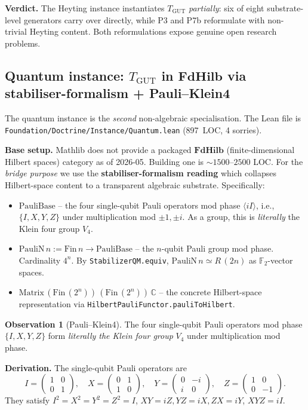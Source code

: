 \documentclass[11pt,a4paper]{article}
\theoremstyle{plain}
\theoremstyle{definition}
\newtheorem{observation}[theorem]{Observation}
\theoremstyle{remark}
\newcommand{\F}{\mathbb{F}}
\newcommand{\C}{\mathbb{C}}
\newcommand{\cat}[1]{\mathbf{#1}}
\newcommand{\FdHilb}{\cat{FdHilb}}
\newcommand{\TGUT}{T_{\mathrm{GUT}}}
\newcommand{\PauliBase}{\mathrm{PauliBase}}
\newcommand{\PauliN}{\mathrm{PauliN}}
\begin{document}
\textbf{Verdict.} The Heyting instance instantiates $\TGUT$ \emph{partially}: six of eight substrate-level generators carry over directly, while P3 and P7b reformulate with non-trivial Heyting content. Both reformulations expose genuine open research problems.

\subsection{Quantum instance: $\TGUT$ in $\FdHilb$ via stabiliser-formalism + Pauli--Klein4}\label{sec:inst:quantum}

The quantum instance is the \emph{second} non-algebraic specialisation. The Lean file is \texttt{Foundation/Doctrine/Instance/Quantum.lean} (897~LOC, 4 sorries).

\textbf{Base setup.} Mathlib does not provide a packaged $\FdHilb$ (finite-dimensional Hilbert spaces) category as of 2026-05. Building one is ${\sim}1500$--$2500$ LOC. For the \emph{bridge purpose} we use the \textbf{stabiliser-formalism reading} which collapses Hilbert-space content to a transparent algebraic substrate. Specifically:

\begin{itemize}[leftmargin=*]
\item $\PauliBase$ -- the four single-qubit Pauli operators mod phase $\langle iI \rangle$, i.e., $\{I, X, Y, Z\}$ under multiplication mod $\pm 1, \pm i$. As a group, this is \emph{literally} the Klein four group $V_4$.
\item $\PauliN\,n := \mathrm{Fin}\,n \to \PauliBase$ -- the $n$-qubit Pauli group mod phase. Cardinality $4^n$. By \texttt{StabilizerQM.equiv}, $\PauliN\,n \simeq R\,(2n)$ as $\F_2$-vector spaces.
\item $\mathrm{Matrix}\,(\mathrm{Fin}\,(2^n))\,(\mathrm{Fin}\,(2^n))\,\C$ -- the concrete Hilbert-space representation via \texttt{HilbertPauliFunctor.pauliToHilbert}.
\end{itemize}

\begin{observation}[Pauli--Klein4]\label{obs:pauli-klein4}
The four single-qubit Pauli operators mod phase $\{I, X, Y, Z\}$ form \emph{literally the Klein four group} $V_4$ under multiplication mod phase.
\end{observation}

\textbf{Derivation.} The single-qubit Pauli operators are
\[
I = \begin{pmatrix} 1 & 0 \\ 0 & 1 \end{pmatrix}, \quad
X = \begin{pmatrix} 0 & 1 \\ 1 & 0 \end{pmatrix}, \quad
Y = \begin{pmatrix} 0 & -i \\ i & 0 \end{pmatrix}, \quad
Z = \begin{pmatrix} 1 & 0 \\ 0 & -1 \end{pmatrix}.
\]
They satisfy $I^2 = X^2 = Y^2 = Z^2 = I$, $XY = iZ, YZ = iX, ZX = iY$, $XYZ = iI$.
\end{document}
